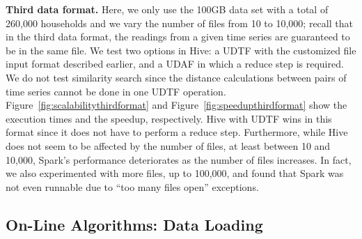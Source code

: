 \documentclass[prodmode,acmtods]{acmsmall}
\begin{document}
\begin{figure*}[t]
 \centering
 \hspace{-5pt}
 \hspace{-5pt}
 \caption{Speedup obtained using the third data format in Spark and Hive, 100 files, 1GB per file.}
  \label{fig:speedupthirdformat}
\end{figure*}

{\bf Third data format.} Here, we only use the 100GB data set with a total of 260,000 households and we vary the number of files from 10 to 10,000; recall that in the third data format, the readings from a given time series are guaranteed to be in the same file. We test two options in Hive: a UDTF with the customized file input format described earlier, and a UDAF in which a reduce step is required.  We do not test similarity search since the distance calculations between pairs of time series cannot be done in one UDTF operation.  Figure~\ref{fig:scalabilitythirdformat} and Figure~\ref{fig:speedupthirdformat} show the execution times and the speedup, respectively.  Hive with UDTF wins in this format since it does not have to perform a reduce step.  Furthermore, while Hive does not seem to be affected by the number of files, at least between 10 and 10,000, Spark's performance deteriorates as the number of files increases.  In fact, we also experimented with more files, up to 100,000, and found that Spark was not even runnable due to ``too many files open'' exceptions.  

 
\subsection{On-Line Algorithms: Data Loading} \label{sec:online_loading}
\end{document}
